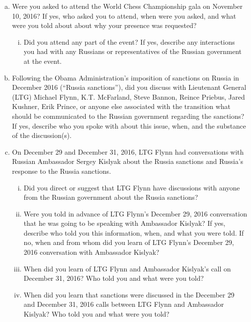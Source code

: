 \begin{enumerate}[a.]

\item Were you asked to attend the World Chess Championship gala on November 10, 2016?
If yes, who asked you to attend, when were you asked, and what were you told about about why your presence was requested?

\begin{enumerate}[i.]

\item Did you attend any part of the event?
If yes, describe any interactions you had with any Russians or representatives of the Russian government at the event.

\end{enumerate}

\item Following the Obama Administration’s imposition of sanctions on Russia in December 2016 (“Russia sanctions”), did you discuss with Lieutenant General (LTG) Michael Flynn, K.T. McFarland, Steve Bannon, Reince Priebus, Jared Kushner, Erik Prince, or anyone else associated with the transition what should be communicated to the Russian government regarding the sanctions?
If yes, describe who you spoke with about this issue, when, and the substance of the discussion(s).

\item On December 29 and December 31, 2016, LTG Flynn had conversations with Russian Ambassador Sergey Kislyak about the Russia sanctions and Russia’s response to the Russia sanctions.

\begin{enumerate}[i.]

\item Did you direct or suggest that LTG Flynn have discussions with anyone from the Russian government about the Russia sanctions?

\item Were you told in advance of LTG Flynn’s December 29, 2016 conversation that he was going to be speaking with Ambassador Kislyak?
If yes, describe who told you this information, when, and what you were told.
If no, when and from whom did you learn of LTG Flynn’s December 29, 2016 conversation with Ambassador Kislyak?

\item When did you learn of LTG Flynn and Ambassador Kislyak’s call on December 31, 2016? Who told you and what were you told?

\item When did you learn that sanctions were discussed in the December 29 and December 31, 2016 calls between LTG Flynn and Ambassador Kislyak?
Who told you and what were you told?


\end{enumerate}
\end{enumerate}
